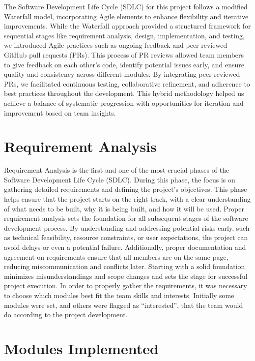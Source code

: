 The Software Development Life Cycle (SDLC) for this project follows a modified Waterfall model, incorporating Agile elements to enhance flexibility and iterative improvements. While the Waterfall approach provided a structured framework for sequential stages like requirement analysis, design, implementation, and testing, we introduced Agile practices such as ongoing feedback and peer-reviewed GitHub pull requests (PRs). This process of PR reviews allowed team members to give feedback on each other's code, identify potential issues early, and ensure quality and consistency across different modules. By integrating peer-reviewed PRs, we facilitated continuous testing, collaborative refinement, and adherence to best practices throughout the development. This hybrid methodology helped us achieve a balance of systematic progression with opportunities for iteration and improvement based on team insights.

\section{Requirement Analysis}

Requirement Analysis is the first and one of the most crucial phases of the Software Development Life Cycle (SDLC). During this phase, the focus is on gathering detailed requirements and defining the project’s objectives. This phase helps ensure that the project starts on the right track, with a clear understanding of what needs to be built, why it is being built, and how it will be used. Proper requirement analysis sets the foundation for all subsequent stages of the software development process.
By understanding and addressing potential risks early, such as technical feasibility, resource constraints, or user expectations, the project can avoid delays or even a potential failure. Additionally,  proper documentation and agreement on requirements ensure that all members are on the same page, reducing miscommunication and conflicts later. 
Starting with a solid foundation minimizes misunderstandings and scope changes and sets the stage for successful project execution. In order to properly gather the requirements, it was necessary to choose which modules best fit the team skills and interests. Initially some modules were set, and others were flagged as “interested”, that the team would do according to the project development. 


\section{Modules Implemented}

